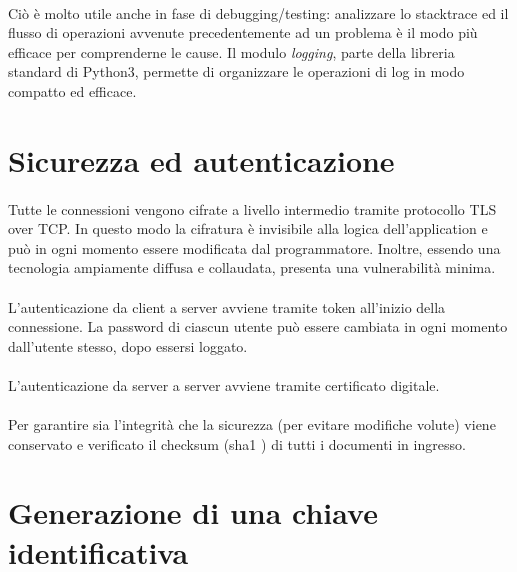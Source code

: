 \documentclass[11pt,a4paper,english]{article}
\begin{document}
\paragraph{} Ciò è molto utile anche in fase di debugging/testing: analizzare lo stacktrace ed il flusso di operazioni avvenute precedentemente ad un problema è il modo più efficace per comprenderne le cause. Il modulo \emph{logging}, parte della libreria standard di Python3, permette di organizzare le operazioni di log in modo compatto ed efficace. 


\section{Sicurezza ed autenticazione}

\paragraph{} Tutte le connessioni vengono cifrate a livello intermedio tramite protocollo TLS \cite{tls} over TCP. In questo modo la cifratura è invisibile alla logica dell'application e può in ogni momento essere modificata dal programmatore. Inoltre, essendo una tecnologia ampiamente diffusa e collaudata, presenta una vulnerabilità minima. 

\paragraph{} L'autenticazione da client a server avviene tramite token all'inizio della connessione. La password di ciascun utente può essere cambiata in ogni momento dall'utente stesso, dopo essersi loggato. 

\paragraph{} L'autenticazione da server a server avviene tramite certificato digitale.

\paragraph{} Per garantire sia l'integrità che la sicurezza (per evitare modifiche volute) viene conservato e verificato il checksum (sha1 \cite{sha1}) di tutti i documenti in ingresso. 


\section{Generazione di una chiave identificativa}
\end{document}
